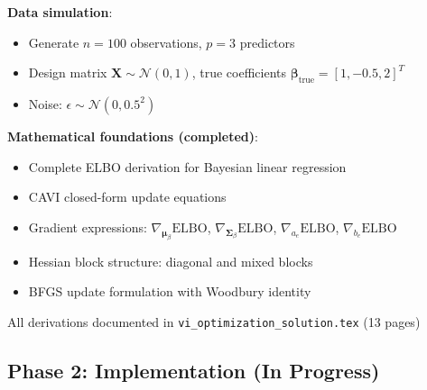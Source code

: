 \documentclass[11pt]{article}
\newcommand{\N}{\mathcal{N}}
\newcommand{\ELBO}{\text{ELBO}}
\begin{document}
\textbf{Data simulation}:
\begin{itemize}
\item Generate $n = 100$ observations, $p = 3$ predictors
\item Design matrix $\bm{X} \sim \N(0, 1)$, true coefficients $\bm{\beta}_{\text{true}} = [1, -0.5, 2]^T$
\item Noise: $\epsilon \sim \N(0, 0.5^2)$
\end{itemize}

\textbf{Mathematical foundations (completed)}:
\begin{itemize}
\item Complete ELBO derivation for Bayesian linear regression
\item CAVI closed-form update equations
\item Gradient expressions: $\nabla_{\bm{\mu}_\beta} \ELBO$, $\nabla_{\bm{\Sigma}_\beta} \ELBO$, $\nabla_{a_e} \ELBO$, $\nabla_{b_e} \ELBO$
\item Hessian block structure: diagonal and mixed blocks
\item BFGS update formulation with Woodbury identity
\end{itemize}

All derivations documented in \texttt{vi\_optimization\_solution.tex} (13 pages)

\subsection{Phase 2: Implementation (In Progress)}
\end{document}
